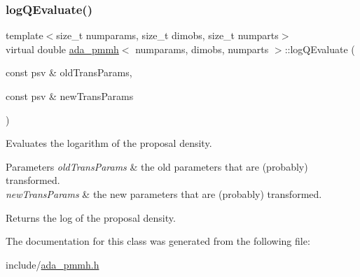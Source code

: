 \subsubsection{\texorpdfstring{log\+Q\+Evaluate()}{logQEvaluate()}}
{\footnotesize\ttfamily template$<$size\+\_\+t numparams, size\+\_\+t dimobs, size\+\_\+t numparts$>$ \\
virtual double \hyperlink{classada__pmmh}{ada\+\_\+pmmh}$<$ numparams, dimobs, numparts $>$\+::log\+Q\+Evaluate (\begin{DoxyParamCaption}\item[{const psv \&}]{old\+Trans\+Params,  }\item[{const psv \&}]{new\+Trans\+Params }\end{DoxyParamCaption})\hspace{0.3cm}{\ttfamily [pure virtual]}}



Evaluates the logarithm of the proposal density. 


\begin{DoxyParams}{Parameters}
{\em old\+Trans\+Params} & the old parameters that are (probably) transformed. \\
\hline
{\em new\+Trans\+Params} & the new parameters that are (probably) transformed. \\
\hline
\end{DoxyParams}
\begin{DoxyReturn}{Returns}
the log of the proposal density. 
\end{DoxyReturn}


The documentation for this class was generated from the following file\+:\begin{DoxyCompactItemize}
\item 
include/\hyperlink{ada__pmmh_8h}{ada\+\_\+pmmh.\+h}\end{DoxyCompactItemize}
